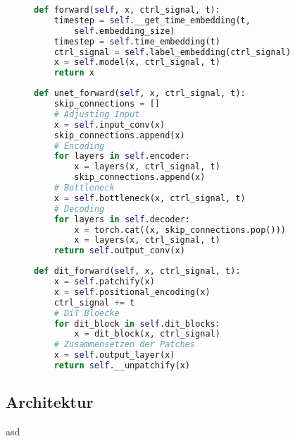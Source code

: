 \begin{figure}[htbp]
\begin{lstlisting}[language=python]
def forward(self, x, ctrl_signal, t):
    timestep = self.__get_time_embedding(t, 
        self.embedding_size)
    timestep = self.time_embedding(t)
    ctrl_signal = self.label_embedding(ctrl_signal)
    x = self.model(x, ctrl_signal, t)
    return x
\end{lstlisting}
    \captionsetup{type=figure}
    \label{fig:DM_forward}
\end{figure}

\begin{figure}[htbp]
\begin{lstlisting}[language=python]
def unet_forward(self, x, ctrl_signal, t):
    skip_connections = []
    # Adjusting Input
    x = self.input_conv(x)
    skip_connections.append(x)
    # Encoding
    for layers in self.encoder:
        x = layers(x, ctrl_signal, t)
        skip_connections.append(x)
    # Bottleneck
    x = self.bottleneck(x, ctrl_signal, t)
    # Decoding
    for layers in self.decoder:
        x = torch.cat((x, skip_connections.pop())) 
        x = layers(x, ctrl_signal, t)
    return self.output_conv(x)
\end{lstlisting}
    \captionsetup{type=figure}
    \label{fig:UNET_forward}
\end{figure}

\begin{figure}[htbp]
\begin{lstlisting}[language=python]
def dit_forward(self, x, ctrl_signal, t):
    x = self.patchify(x)
    x = self.positional_encoding(x)
    ctrl_signal += t
    # DiT Bloecke
    for dit_block in self.dit_blocks:
        x = dit_block(x, ctrl_signal)
    # Zusammensetzen der Patches
    x = self.output_layer(x)
    return self.__unpatchify(x)
\end{lstlisting}
    \captionsetup{type=figure}
    \label{fig:DiT_forward}
\end{figure}





\subsection{Architektur}

asd



